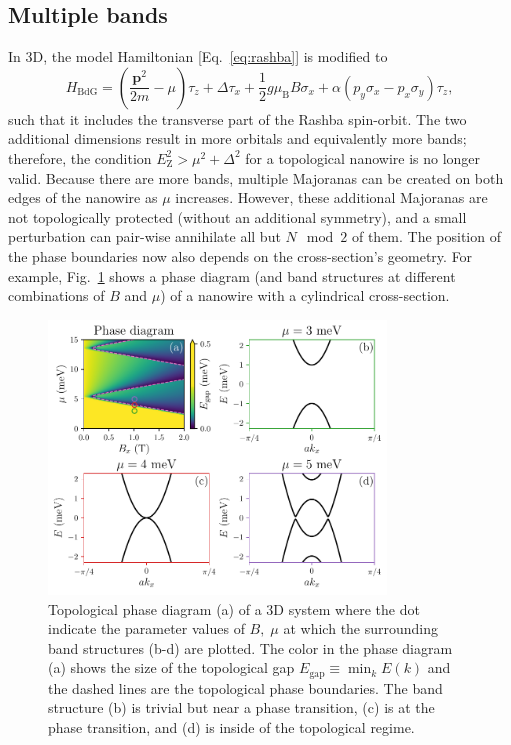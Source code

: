 \subsection{Multiple bands}
In 3D, the model Hamiltonian [Eq.~\eqref{eq:rashba}] is modified to
\begin{equation}
H_{\textrm{BdG}}=\left(\frac{\bm{p}^{2}}{2m}-\mu\right)\tau_{z}+\Delta\tau_{x}+\frac{1}{2}g\mu_{\textrm{B}}B\sigma_{x}+\alpha\left(p_{y}\sigma_{x}-p_{x}\sigma_{y}\right)\tau_{z},\label{eq:3D_Ham}
\end{equation}
such that it includes the transverse part of the Rashba spin-orbit.
The two additional dimensions result in more orbitals and equivalently more bands; therefore, the condition $E_\textrm{Z}^{2}>\mu^{2}+\Delta^{2}$ for a topological nanowire is no longer valid.
Because there are more bands, multiple Majoranas can be created on both edges of the nanowire as $\mu$ increases.
However, these additional Majoranas are not topologically protected (without an additional symmetry), and a small perturbation can pair-wise annihilate all but $N \mod 2$ of them.
The position of the phase boundaries now also depends on the cross-section's geometry.
For example, Fig.~\ref{fig:topo_bands_3D} shows a phase diagram (and band structures at different combinations of $B$ and $\mu$) of a nanowire with a cylindrical cross-section.
\begin{figure}
\begin{center}
\includegraphics[width=0.8\textwidth]{chapter_introduction/figures/phase_diagram_with_bands.pdf}
\caption{Topological phase diagram (a) of a 3D system where the dot indicate the parameter values of $B,\; \mu$ at which the surrounding band structures (b-d) are plotted.
The color in the phase diagram (a) shows the size of the topological gap $E_\textrm{gap} \equiv \min_k E(k)$ and the dashed lines are the topological phase boundaries.
The band structure (b) is trivial but near a phase transition, (c) is at the phase transition, and (d) is inside of the topological regime.
\label{fig:topo_bands_3D}}
\end{center}
\end{figure}

